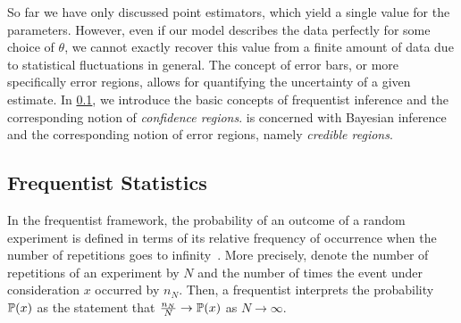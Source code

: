 So far we have only discussed point estimators, which yield a single value for the parameters.
However, even if our model describes the data perfectly for some choice of $\theta$, we cannot exactly recover this value from a finite amount of data due to statistical fluctuations in general.
The concept of error bars, or more specifically error regions, allows for quantifying the uncertainty of a given estimate.
In \cref{sub:stat.frequentist}, we introduce the basic concepts of frequentist inference and the corresponding notion of \emph{confidence regions}.
 is concerned with Bayesian inference and the corresponding notion of error regions, namely \emph{credible regions}.



\subsection{Frequentist Statistics}%
\label{sub:stat.frequentist}

In the frequentist framework, the probability of an outcome of a random experiment is defined in terms of its relative frequency of occurrence when the number of repetitions goes to infinity~\cite{Keynes_2007_Treatise,Kiefer_2012_Introduction}.
More precisely, denote the number of repetitions of an experiment by $N$ and the number of times the event under consideration $x$ occurred by $n_N$.
Then, a frequentist interprets the probability $\mathbb{P}(x)$ as the statement that $\frac{n_N}{N} \to \mathbb{P}(x)$ as $N \to \infty$.

